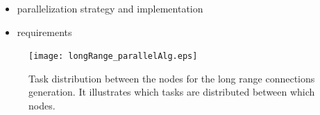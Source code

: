 \documentclass[a4paper]{article}
\begin{document}
\begin{itemize}
      \item parallelization strategy and implementation
      \item requirements 
\end{itemize}

\begin{figure}[ht!]
\centering
\texttt{[image: longRange\_parallelAlg.eps]}
\caption{Task distribution between the nodes for the long range connections generation. It illustrates which tasks are distributed between which nodes.}
\end{figure}

\begin{figure}[ht!]
   	\begin{center}
        \hspace{1cm}
\end{center}
\end{figure}
\end{document}
